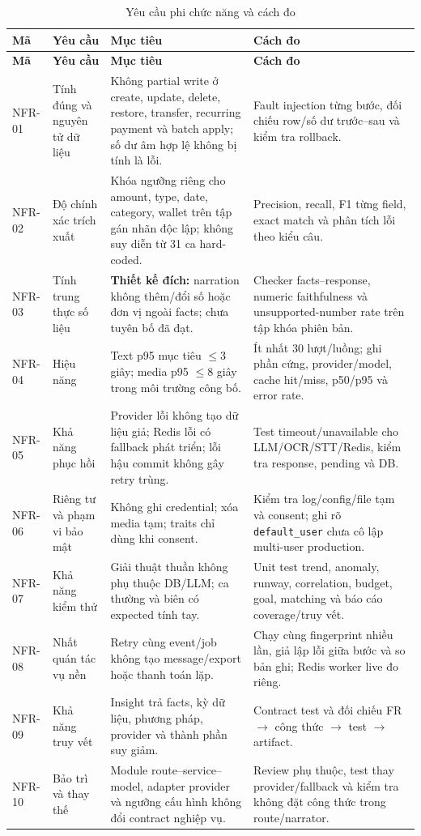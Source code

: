 \begin{longtable}{@{}L{1.2cm}L{2.8cm}L{3.5cm}L{5.2cm}@{}}
  \caption{Yêu cầu phi chức năng và cách đo}\label{tab:nfr}\\
  \toprule
  \textbf{Mã} & \textbf{Yêu cầu} & \textbf{Mục tiêu} & \textbf{Cách đo} \\
  \midrule
  \endfirsthead
  \toprule
  \textbf{Mã} & \textbf{Yêu cầu} & \textbf{Mục tiêu} & \textbf{Cách đo} \\
  \midrule
  \endhead
  NFR-01 & Tính đúng và nguyên tử dữ liệu & Không partial write ở create, update, delete, restore, transfer, recurring payment và batch apply; số dư âm hợp lệ không bị tính là lỗi. & Fault injection từng bước, đối chiếu row/số dư trước--sau và kiểm tra rollback. \\
  NFR-02 & Độ chính xác trích xuất & Khóa ngưỡng riêng cho amount, type, date, category, wallet trên tập gán nhãn độc lập; không suy diễn từ 31 ca hard-coded. & Precision, recall, F1 từng field, exact match và phân tích lỗi theo kiểu câu. \\
  NFR-03 & Tính trung thực số liệu & \textbf{Thiết kế đích:} narration không thêm/đổi số hoặc đơn vị ngoài facts; chưa tuyên bố đã đạt. & Checker facts--response, numeric faithfulness và unsupported-number rate trên tập khóa phiên bản. \\
  NFR-04 & Hiệu năng & Text p95 mục tiêu $\leq3$ giây; media p95 $\leq8$ giây trong môi trường công bố. & Ít nhất 30 lượt/luồng; ghi phần cứng, provider/model, cache hit/miss, p50/p95 và error rate. \\
  NFR-05 & Khả năng phục hồi & Provider lỗi không tạo dữ liệu giả; Redis lỗi có fallback phát triển; lỗi hậu commit không gây retry trùng. & Test timeout/unavailable cho LLM/OCR/STT/Redis, kiểm tra response, pending và DB. \\
  NFR-06 & Riêng tư và phạm vi bảo mật & Không ghi credential; xóa media tạm; traits chỉ dùng khi consent. & Kiểm tra log/config/file tạm và consent; ghi rõ \texttt{default\_user} chưa cô lập multi-user production. \\
  NFR-07 & Khả năng kiểm thử & Giải thuật thuần không phụ thuộc DB/LLM; ca thường và biên có expected tính tay. & Unit test trend, anomaly, runway, correlation, budget, goal, matching và báo cáo coverage/truy vết. \\
  NFR-08 & Nhất quán tác vụ nền & Retry cùng event/job không tạo message/export hoặc thanh toán lặp. & Chạy cùng fingerprint nhiều lần, giả lập lỗi giữa bước và so bản ghi; Redis worker live đo riêng. \\
  NFR-09 & Khả năng truy vết & Insight trả facts, kỳ dữ liệu, phương pháp, provider và thành phần suy giảm. & Contract test và đối chiếu FR $\rightarrow$ công thức $\rightarrow$ test $\rightarrow$ artifact. \\
  NFR-10 & Bảo trì và thay thế & Module route--service--model, adapter provider và ngưỡng cấu hình không đổi contract nghiệp vụ. & Review phụ thuộc, test thay provider/fallback và kiểm tra không đặt công thức trong route/narrator. \\
  \bottomrule
\end{longtable}

